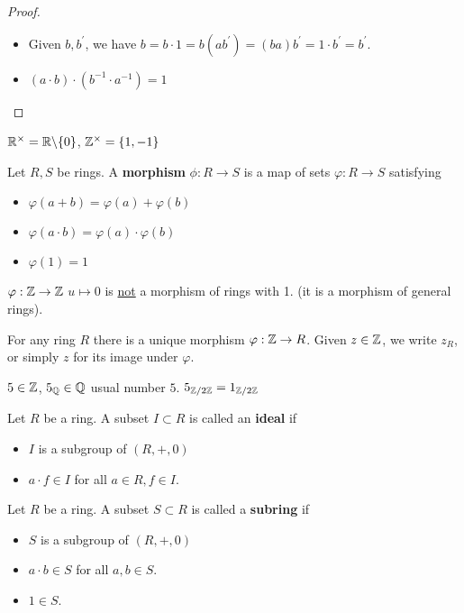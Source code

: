 \begin{proof} \hspace{0.5cm}
    \begin{itemize}
        \item Given $b, b^\prime$, we have $b = b \cdot 1 = b(ab^\prime) = (ba)b^\prime = 1 \cdot b^\prime
         = b^\prime$.
         \item $(a \cdot b) \cdot (b^{-1} \cdot a^{-1}) = 1$
    \end{itemize}
\end{proof}
\begin{ex}
    $\mathbb{R}^\times = \mathbb{R} \backslash \{0\}$, $\mathbb{Z}^\times = \{1, -1\}$
\end{ex}
\begin{defn} \label{Defn 6, Jan 4}
    Let $R, S$ be rings. A \textbf{morphism} $\phi:R \rightarrow S$ is a map of
    sets $\varphi:R \rightarrow S$ satisfying
    \begin{itemize}
        \item $\varphi(a + b) = \varphi(a) + \varphi(b)$
        \item $\varphi(a \cdot b) = \varphi(a) \cdot \varphi(b)$
        \item $\varphi(1) = 1$
    \end{itemize}
\end{defn}
\begin{ex}
    $\varphi:\mathbb{Z} \rightarrow \mathbb{Z}$ $u \mapsto 0$ is \underline{not} a morphism of
    rings with 1. (it is a morphism of general rings).
\end{ex}
\begin{fact}\label{Fact 7, Jan 4}
    For any ring $R$ there is a unique morphism $\varphi:\mathbb{Z} \rightarrow R$. Given
    $z \in \mathbb{Z}$, we write $z_{R}$, or simply $z$ for its image under $\varphi$.
\end{fact}
\begin{ex}
    $5 \in \mathbb{Z}$, $5_{\mathbb{Q}} \in \mathbb{Q}$ usual number $5$. $5_{\mathbb{Z} / 2 \mathbb{Z}} = 1_{\mathbb{Z} / 2 \mathbb{Z}}$
\end{ex}
\begin{defn} \label{Defn 8, Jan 4}
    Let $R$ be a ring. A subset $I \subset R$ is called an \textbf{ideal} if
    \begin{itemize}
        \item $I$ is a subgroup of $(R, +, 0)$
        \item $a \cdot f \in I$ for all $a \in R, f \in I$.
    \end{itemize}
\end{defn}
\begin{defn} \label{Defn 9, Jan 4}
    Let $R$ be a ring. A subset $S \subset R$ is called a \textbf{subring} if
    \begin{itemize}
        \item $S$ is a subgroup of $(R, +, 0)$
        \item $a \cdot b \in S$ for all $a, b \in S$.
        \item $1 \in S$.
    \end{itemize}
\end{defn}
